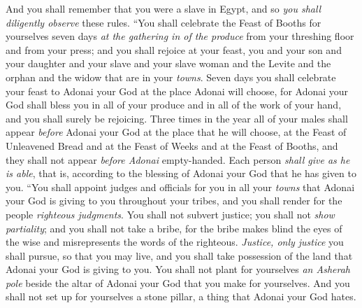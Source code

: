 \begin{biblechapter}
\verse And you shall remember that you were a slave in Egypt, and so \textit{you shall diligently observe} these rules.
\verse “You shall celebrate the Feast of Booths for yourselves seven days \textit{at the gathering in of the produce} from your threshing floor and from your press;
\verse and you shall rejoice at your feast, you and your son and your daughter and your slave and your slave woman and the Levite and the orphan and the widow that are in your \textit{towns}.
\verse Seven days you shall celebrate your feast to Adonai your God at the place Adonai will choose, for Adonai your God shall bless you in all of your produce and in all of the work of your hand, and you shall surely be rejoicing.
\verse Three times in the year all of your males shall appear \textit{before } Adonai your God at the place that he will choose, at the Feast of Unleavened Bread and at the Feast of Weeks and at the Feast of Booths, and they shall not appear \textit{before Adonai} empty-handed.
\verse Each person \textit{shall give as he is able}, that is, according to the blessing of Adonai your God that he has given to you.
\verse “You shall appoint judges and officials for you in all your \textit{towns} that Adonai your God is giving to you throughout your tribes, and you shall render for the people \textit{righteous judgments}.
\verse You shall not subvert justice; you shall not \textit{show partiality}; and you shall not take a bribe, for the bribe makes blind the eyes of the wise and misrepresents the words of the righteous.
\verse \textit{Justice, only justice} you shall pursue, so that you may live, and you shall take possession of the land that Adonai your God is giving to you.
\verse You shall not plant for yourselves \textit{an Asherah pole} beside the altar of Adonai your God that you make for yourselves.
\verse And you shall not set up for yourselves a stone pillar, a thing that Adonai your God hates.
\end{biblechapter}

